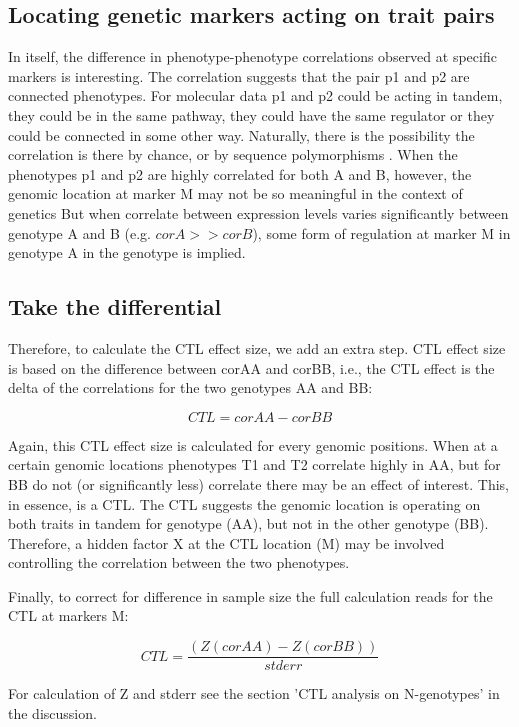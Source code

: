   \subsection{Locating genetic markers acting on trait pairs}
  In itself, the difference in phenotype-phenotype correlations observed at specific markers is interesting. The correlation 
  suggests that the pair p1 and p2 are connected phenotypes. For molecular data p1 and p2 could be acting in tandem, they could 
  be in the same pathway, they could have the same regulator or they could be connected in some other way.
  Naturally, there is the possibility the correlation is there by chance, or by sequence polymorphisms \cite{Alberts:2007}.
  When the phenotypes p1 and p2 are highly correlated for both A and B, however, the genomic location at marker M may not be so
  meaningful in the context of genetics  But when correlate between expression levels varies significantly between genotype A 
  and B (e.g. $corA >> corB$), some form of regulation at marker M in genotype A in the genotype is implied.

  \subsection{Take the differential}
  Therefore, to calculate the CTL effect size, we add an extra step. CTL effect size is based on the difference between corAA and 
  corBB, i.e., the CTL effect is the delta of the correlations for the two genotypes AA and BB:

  $$ CTL = corAA - corBB $$

  Again, this CTL effect size is calculated for every genomic positions.  When at a certain genomic locations phenotypes T1 and T2 
  correlate highly in AA, but for BB do not (or significantly less) correlate there may be an effect of interest. This, in essence, 
  is a CTL. The CTL suggests the genomic location is operating on both traits in tandem for genotype (AA), but not in the other 
  genotype (BB). Therefore, a hidden factor X at the CTL location (M) may be involved controlling the correlation between the two 
  phenotypes.

  Finally, to correct for difference in sample size the full calculation reads for the CTL at markers M:
  
  $$  CTL = \frac{(Z(corAA) - Z(corBB))}{stderr} $$

  For calculation of Z and stderr see the section 'CTL analysis on N-genotypes' in the discussion.

